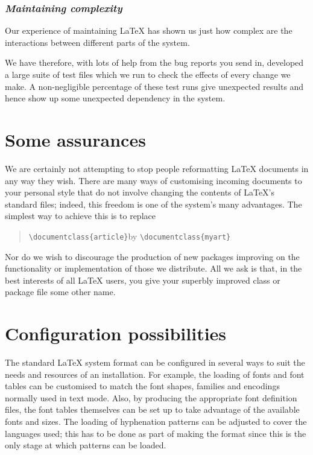 \documentclass{ltxguide}[1995/11/28]
\newcommand{\reasonsection}[1]{\subsubsection*{\it #1}}
\begin{document}
\reasonsection{Maintaining complexity}
\label{sec:compl}

Our experience of maintaining \LaTeX{} has shown us just how complex
are the interactions between different parts of the system.

We have therefore, with lots of help from the bug reports you send in,
developed a large suite of test files which we run to check the
effects of every change we make.  A non-negligible percentage of these
test runs give unexpected results and hence show up some unexpected
dependency in the system.


\section{Some assurances}
\label{sec:conc}

We are certainly not attempting to stop people reformatting \LaTeX{}
documents in any way they wish.  There are many ways of customising
incoming documents to your personal style that do not involve changing
the contents of \LaTeX{}'s standard files; indeed, this freedom is one
of the system's many advantages.
The simplest way to achieve this is to replace
\begin{quote}
\verb|\documentclass{article}|\quad by\quad
\verb|\documentclass{myart}| 
\end{quote}

Nor do we wish to discourage the production of new packages improving
on the functionality or implementation of those we distribute.  All we
ask is that, in the best interests of all \LaTeX{} users, you give
your superbly improved class or package file some other name. 

\section{Configuration possibilities}
\label{sec:conposs}

The standard \LaTeX{} system format can be configured in several ways
to suit the needs and resources of an installation.  For example, the
loading of fonts and font tables can be customised to match the font
shapes, families and encodings normally used in text mode.  Also, by
producing the appropriate font definition files, the font tables
themselves can be set up to take advantage of the available fonts and
sizes.  The loading of hyphenation patterns can be adjusted to cover
the languages used; this has to be done as part of making the format
since this is the only stage at which patterns can be loaded.
\end{document}
